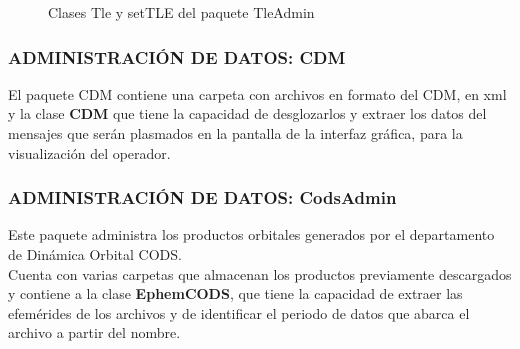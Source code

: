 \begin{figure}[!h]
\centering
  \hspace{1.5cm}
  \caption[Clases Tle y setTLE]{Clases Tle y setTLE del paquete TleAdmin}
  \label{fig:Tleadmin}
\end{figure}

\subsubsection*{ADMINISTRACI\'ON DE DATOS: CDM}
El paquete CDM contiene una carpeta con archivos en formato del CDM, en xml y la clase {\bf{CDM}} que tiene la capacidad de desglozarlos y extraer los datos del mensajes que ser\'an plasmados en la pantalla de la interfaz gr\'afica, para la visualizaci\'on del operador.\\

\subsubsection*{ADMINISTRACI\'ON DE DATOS: CodsAdmin}
Este paquete administra los productos orbitales generados por el departamento de Din\'amica Orbital \ac{CODS}.\\
Cuenta con varias carpetas que almacenan los productos previamente descargados y contiene a la clase {\bf{EphemCODS}}, que tiene la capacidad de extraer las efem\'erides de los archivos y de identificar el periodo de datos que abarca el archivo a partir del nombre.\\

